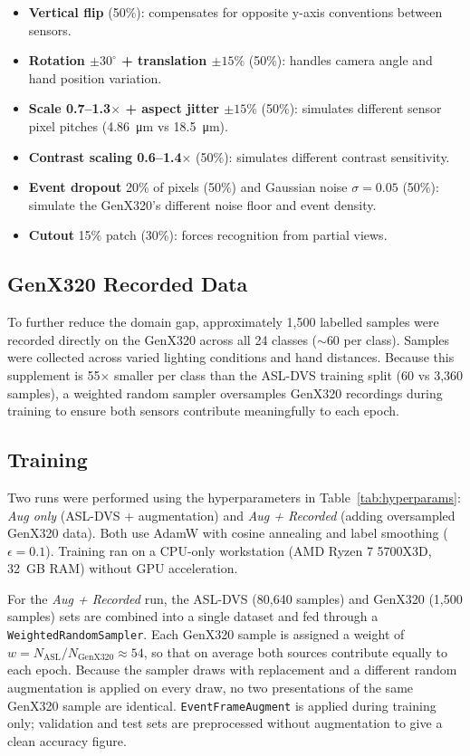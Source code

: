 \documentclass[journal]{IEEEtran}
\begin{document}
\begin{itemize}
    \item \textbf{Vertical flip} (50\%): compensates for opposite y-axis conventions between sensors.
    \item \textbf{Rotation $\pm30^\circ$ + translation $\pm15\%$} (50\%): handles camera angle and hand position variation.
    \item \textbf{Scale 0.7--1.3$\times$ + aspect jitter $\pm15\%$} (50\%): simulates different sensor pixel pitches (\SI{4.86}{\micro\metre} vs \SI{18.5}{\micro\metre}).
    \item \textbf{Contrast scaling 0.6--1.4$\times$} (50\%): simulates different contrast sensitivity.
    \item \textbf{Event dropout} 20\% of pixels (50\%) and Gaussian noise $\sigma{=}0.05$ (50\%): simulate the GenX320's different noise floor and event density.
    \item \textbf{Cutout} 15\% patch (30\%): forces recognition from partial views.
\end{itemize}

\subsection{GenX320 Recorded Data}

To further reduce the domain gap, approximately 1,500 labelled samples were recorded directly on the GenX320 across all 24 classes (${\sim}60$ per class). Samples were collected across varied lighting conditions and hand distances. Because this supplement is 55$\times$ smaller per class than the ASL-DVS training split (60 vs 3,360 samples), a weighted random sampler oversamples GenX320 recordings during training to ensure both sensors contribute meaningfully to each epoch.

\subsection{Training}

Two runs were performed using the hyperparameters in Table~\ref{tab:hyperparams}: \textit{Aug only} (ASL-DVS + augmentation) and \textit{Aug + Recorded} (adding oversampled GenX320 data). Both use AdamW with cosine annealing and label smoothing ($\epsilon{=}0.1$). Training ran on a CPU-only workstation (AMD Ryzen 7 5700X3D, \SI{32}{GB} RAM) without GPU acceleration.

For the \textit{Aug + Recorded} run, the ASL-DVS (80,640 samples) and GenX320 (1,500 samples) sets are combined into a single dataset and fed through a \texttt{WeightedRandomSampler}. Each GenX320 sample is assigned a weight of $w = N_{\text{ASL}} / N_{\text{GenX320}} \approx 54$, so that on average both sources contribute equally to each epoch. Because the sampler draws with replacement and a different random augmentation is applied on every draw, no two presentations of the same GenX320 sample are identical. \texttt{EventFrameAugment} is applied during training only; validation and test sets are preprocessed without augmentation to give a clean accuracy figure.
\end{document}
